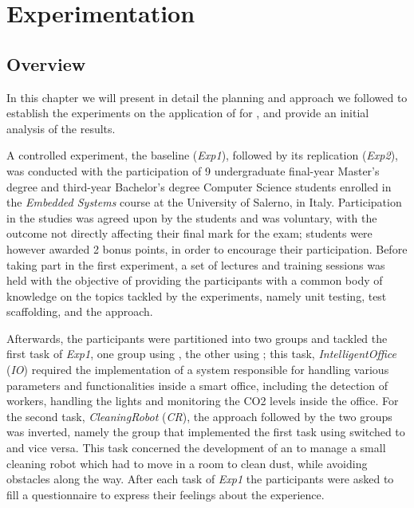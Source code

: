\chapter{Experimentation}
\label{chap:5_approach}
\section{Overview}
In this chapter we will present in detail the planning and approach we followed to establish the experiments on the application of \tdd for \ess, and provide an initial analysis of the results.

A controlled experiment, the baseline (\textit{Exp1}), followed by its replication (\textit{Exp2}), was conducted with the participation of 9 undergraduate final-year Master's degree and third-year Bachelor's degree Computer Science students enrolled in the \textit{Embedded Systems} course at the University of Salerno, in Italy. Participation in the studies was agreed upon by the students and was voluntary, with the outcome not directly affecting their final mark for the exam; students were however awarded 2 bonus points, in order to encourage their participation.
Before taking part in the first experiment, a set of lectures and training sessions was held with the objective of providing the participants with a common body of knowledge on the topics tackled by the experiments, namely unit testing, test scaffolding, and the \tdd approach.

Afterwards, the participants were partitioned into two groups and tackled the first task of \textit{Exp1}, one group using \tdd, the other using \notdd; this task, \textit{IntelligentOffice} (\textit{IO}) required the implementation of a system responsible for handling various parameters and functionalities inside a smart office, including the detection of workers, handling the lights and monitoring the CO2 levels inside the office.
For the second task, \textit{CleaningRobot} (\textit{CR}), the approach followed by the two groups was inverted, namely the group that implemented the first task using \tdd switched to \notdd and vice versa. This task concerned the development of an \es to manage a small cleaning robot which had to move in a room to clean dust, while avoiding obstacles along the way.
After each task of \textit{Exp1} the participants were asked to fill a questionnaire to express their feelings about the experience.


